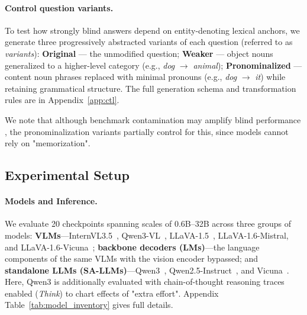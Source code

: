 \documentclass[letterpaper]{article}
\begin{document}
\paragraph{Control question variants.}
\label{sec:control}
To test how strongly blind answers depend on entity-denoting lexical anchors,
we generate three progressively abstracted variants of each question (referred to as \emph{variants}): %
\textbf{Original} — the unmodified question;
\textbf{Weaker} — object nouns generalized to a higher-level category (e.g., \emph{dog} $\rightarrow$ \emph{animal});
\textbf{Pronominalized} — content noun phrases replaced with minimal pronouns (e.g., \emph{dog} $\rightarrow$ \emph{it}) while retaining grammatical structure.
The full generation schema and transformation rules are in Appendix~\ref{app:ctl}. 

We note that although benchmark contamination may amplify blind performance \citep{chen2024are}, the pronominalization variants partially control for this, since models cannot rely on "memorization".


\subsection{Experimental Setup}
\label{sec:exp_setup}

\paragraph{Models and Inference.}

We evaluate 20 checkpoints spanning scales of 0.6B--32B across three groups of models:
\textbf{VLMs}---InternVL3.5~\citep{wang2025internvl35}, Qwen3-VL~\citep{bai2025qwen3vl}, LLaVA-1.5~\citep{liu2023visual}, LLaVA-1.6-Mistral, and LLaVA-1.6-Vicuna~\citep{liu2024llavanext};
\textbf{backbone decoders (LMs)}---the language components of the same VLMs with the vision encoder bypassed; and
\textbf{standalone LLMs (SA-LLMs)}---Qwen3~\citep{yang2025qwen3}, Qwen2.5-Instruct~\citep{qwen2025qwen25}, and Vicuna~\citep{zheng2023vicuna}.
Here, Qwen3 is additionally evaluated with chain-of-thought reasoning traces enabled (\textit{Think}) to chart effects of "extra effort".
Appendix Table~\ref{tab:model_inventory} gives full details.
\end{document}
